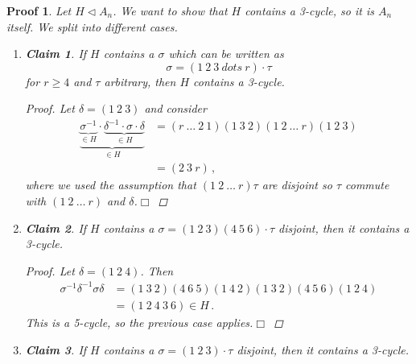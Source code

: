 \documentclass{article}
\theoremstyle{plain}\theoremheaderfont{\normalfont\itshape}\theorembodyfont{\rmfamily}\theoremseparator{.}\newtheorem*{rem}{Remark}\newtheorem*{ex}{Example}\newtheorem*{proof}{Proof}\newtheorem*{altp}{Alternative proof}\newtheorem*{nonex}{Non-Example}
\theoremstyle{plain}\theoremheaderfont{\normalfont\bfseries}\theorembodyfont{\rmfamily}\theoremseparator{.}\newtheorem{thm}{Theorem}[section]\newtheorem{lem}[thm]{Lemma}\newtheorem{prop}[thm]{Proposition}\newtheorem*{cor}{Corollary}\newtheorem{defn}[thm]{Definition}\newtheorem{clm}[thm]{Claim}\newtheorem{clminproof}{Claim}\newtheorem*{notn}{Notation}\newtheorem*{exer}{Exercise}\newtheorem*{lemnn}{Lemma}
\theoremstyle{break}\theoremheaderfont{\normalfont\itshape}\theorembodyfont{\rmfamily}\theoremseparator{.\medskip}\newtheorem*{proofskip}{Proof}\newtheorem*{exs}{Examples}\newtheorem*{rems}{Remarks}\newtheorem*{obs}{Observations}
\theoremstyle{break}\theoremheaderfont{\normalfont\bfseries}\theorembodyfont{\rmfamily}\theoremseparator{.\medskip}\newtheorem{lemskip}[thm]{Lemma}\newtheorem{defnskip}[thm]{Definition}\newtheorem{propskip}[thm]{Proposition}\newtheorem{thmskip}[thm]{Theorem}
\numberwithin{equation}{section}
\newcommand{\qed}{\hfill\ensuremath{\Box}}
\begin{document}
\begin{proofskip}
        Let \(H\lhd A_n\). We want to show that \(H\) contains a 3-cycle, so it is \(A_n\) itself. We split into different cases.
        \begin{enumerate}[topsep=0pt,label=(\roman*),parsep=1em,rightmargin=20pt]
            \item \begin{clminproof}
                If \(H\) contains a \(\sigma\) which can be written as
                \[\sigma=(1 \ 2 \ 3 \ dots \ r)\cdot\tau\]
                for \(r\ge 4\) and \(\tau\) arbitrary, then \(H\) contains a 3-cycle.
            \end{clminproof}
        \begin{proof}
                Let \(\delta=(1 \ 2 \ 3)\) and consider
                \begin{align*}
                    \underbrace{\underbrace{\sigma^{-1}}_{\in H}\cdot\underbrace{\delta^{-1}\cdot\sigma\cdot\delta}_{\in H}}_{\in H}&=(r \ \dots \ 2 \ 1)(1 \ 3 \ 2)(1 \ 2 \ \dots \ r)(1 \ 2 \ 3)\\
                    &=(2 \ 3 \ r)\,,
                \end{align*}
                where we used the assumption that \((1 \ 2 \ \dots \ r)\tau\) are disjoint so \(\tau\) commute with \((1 \ 2 \ \dots \ r)\) and \(\delta\).\qed
            \end{proof}
            \item \begin{clminproof}
                If \(H\) contains a \(\sigma=(1 \ 2 \ 3)(4 \ 5 \ 6)\cdot\tau\) disjoint, then it contains a 3-cycle.
            \end{clminproof}
        \begin{proof}
                Let \(\delta=(1 \ 2 \ 4)\). Then
                \begin{align*}
                    \sigma^{-1}\delta^{-1}\sigma\delta&=(1 \ 3 \ 2)(4 \ 6 \ 5)(1 \ 4 \ 2)(1 \ 3 \ 2)(4 \ 5 \ 6)(1 \ 2 \ 4)\\
                    &=(1 \ 2 \ 4 \ 3 \ 6)\in H\,.
                \end{align*}
                This is a 5-cycle, so the previous case applies.\qed
            \end{proof}
            \item \begin{clminproof}
                If \(H\) contains a \(\sigma=(1 \ 2 \ 3)\cdot\tau\) disjoint, then it contains a 3-cycle.
            \end{clminproof}

\end{enumerate}
\end{proofskip}
\end{document}
